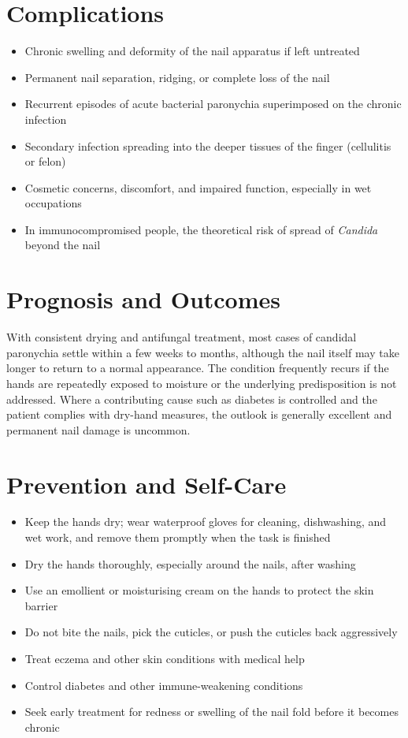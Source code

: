 \section*{Complications}
\begin{itemize}
    \item Chronic swelling and deformity of the nail apparatus if left untreated
    \item Permanent nail separation, ridging, or complete loss of the nail
    \item Recurrent episodes of acute bacterial paronychia superimposed on the chronic infection
    \item Secondary infection spreading into the deeper tissues of the finger (cellulitis or felon)
    \item Cosmetic concerns, discomfort, and impaired function, especially in wet occupations
    \item In immunocompromised people, the theoretical risk of spread of \textit{Candida} beyond the nail
\end{itemize}

\section*{Prognosis and Outcomes}
With consistent drying and antifungal treatment, most cases of candidal paronychia settle within a few weeks to months, although the nail itself may take longer to return to a normal appearance. The condition frequently recurs if the hands are repeatedly exposed to moisture or the underlying predisposition is not addressed. Where a contributing cause such as diabetes is controlled and the patient complies with dry-hand measures, the outlook is generally excellent and permanent nail damage is uncommon.

\section*{Prevention and Self-Care}
\begin{itemize}
    \item Keep the hands dry; wear waterproof gloves for cleaning, dishwashing, and wet work, and remove them promptly when the task is finished
    \item Dry the hands thoroughly, especially around the nails, after washing
    \item Use an emollient or moisturising cream on the hands to protect the skin barrier
    \item Do not bite the nails, pick the cuticles, or push the cuticles back aggressively
    \item Treat eczema and other skin conditions with medical help
    \item Control diabetes and other immune-weakening conditions
    \item Seek early treatment for redness or swelling of the nail fold before it becomes chronic
\end{itemize}

